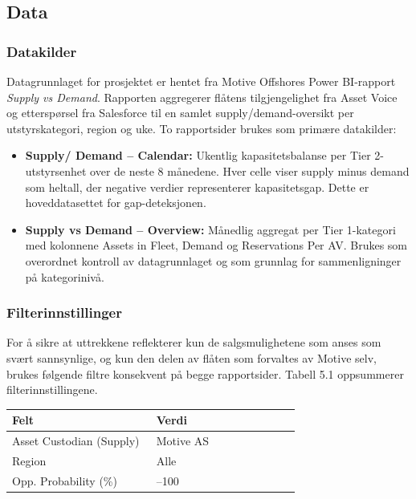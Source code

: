 \documentclass[a4paper,11pt]{article}
\begin{document}
\subsection{Data}

\subsubsection{Datakilder}

Datagrunnlaget for prosjektet er hentet fra Motive Offshores Power BI-rapport \textit{Supply vs Demand}. Rapporten aggregerer flåtens tilgjengelighet fra Asset Voice og etterspørsel fra Salesforce til en samlet supply/demand-oversikt per utstyrskategori, region og uke. To rapportsider brukes som primære datakilder:

\begin{itemize}
\item \textbf{Supply/ Demand – Calendar:} Ukentlig kapasitetsbalanse per Tier 2-utstyrsenhet over de neste 8 månedene. Hver celle viser supply minus demand som heltall, der negative verdier representerer kapasitetsgap. Dette er hoveddatasettet for gap-deteksjonen.
\item \textbf{Supply vs Demand – Overview:} Månedlig aggregat per Tier 1-kategori med kolonnene Assets in Fleet, Demand og Reservations Per AV. Brukes som overordnet kontroll av datagrunnlaget og som grunnlag for sammenligninger på kategorinivå.
\end{itemize}

\subsubsection{Filterinnstillinger}

For å sikre at uttrekkene reflekterer kun de salgsmulighetene som anses som svært sannsynlige, og kun den delen av flåten som forvaltes av Motive selv, brukes følgende filtre konsekvent på begge rapportsider. Tabell 5.1 oppsummerer filterinnstillingene.

\begin{longtable}{|>{\RaggedRight}p{0.480\linewidth}|>{\RaggedRight}p{0.480\linewidth}|}
\hline
\textbf{Felt} & \textbf{Verdi} \\
\hline
\endhead
Asset Custodian (Supply) & Motive AS \\
\hline
Region & Alle \\
\hline
Opp. Probability (\%) & 75–100 \\
\hline
\end{longtable}
\end{document}
